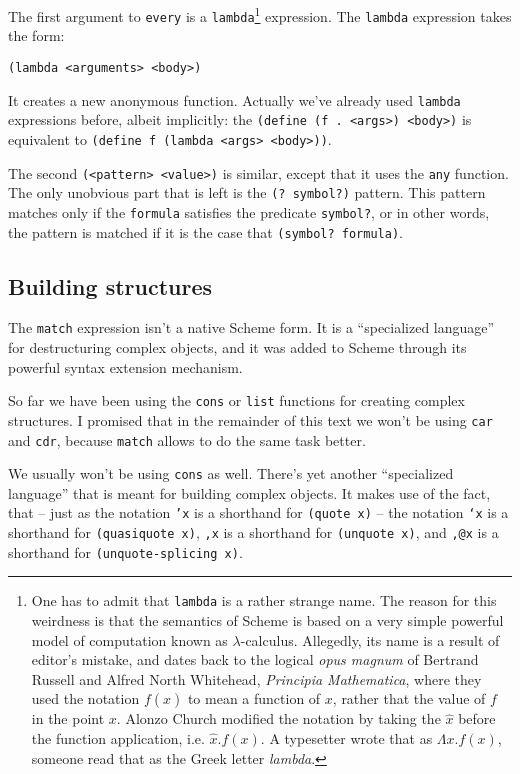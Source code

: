 The first argument to \texttt{every} is a \texttt{lambda}\footnote{
One has to admit that \texttt{lambda} is a rather strange name.
The reason for this weirdness is that the semantics of Scheme
is based on a very simple powerful model of computation known
as $\lambda$-calculus. Allegedly, its name is a result of editor's
mistake, and dates back to the logical \textit{opus magnum}
of Bertrand Russell and Alfred North Whitehead, \textit{Principia
Mathematica}, where they used the notation $f(\hat{x})$
to mean a function of $x$, rather that the value of $f$ in the
point $x$. Alonzo Church modified the notation by taking the
$\hat{x}$ before the function application, i.e. $\hat{x} . f(x)$.
A typesetter wrote that as $\Lambda x . f(x)$, someone read that
as the Greek letter \textit{lambda}\cite{Harrison1996}.} expression.
The \texttt{lambda} expression takes the form:

\texttt{(lambda <arguments> <body>)}

It creates a new anonymous function. Actually we've already used
\texttt{lambda} expressions before, albeit implicitly: the
\texttt{(define (f . <args>) <body>)} is equivalent to
\texttt{(define f (lambda <args> <body>))}.

The second \texttt{(<pattern> <value>)} is similar, except that
it uses the \texttt{any} function. The only unobvious part that is
left is the \texttt{(? symbol?)} pattern. This pattern matches
only if the \texttt{formula} satisfies the predicate \texttt{symbol?},
or in other words, the pattern is matched if it is the case that
\texttt{(symbol? formula)}.

\subsection{Building structures}

The \texttt{match} expression isn't a native Scheme form. It is
a ``specialized language'' for destructuring complex objects, and
it was added to Scheme through its powerful syntax extension
mechanism.

So far we have been using the \texttt{cons} or \texttt{list}
functions for creating complex structures. I promised that in
the remainder of this text we won't be using \texttt{car}
and \texttt{cdr}, because \texttt{match} allows to do the same
task better.

We usually won't be using \texttt{cons} as well. There's yet another
``specialized language'' that is meant for building complex objects.
It makes use of the fact, that -- just as the notation \texttt{'x}
is a shorthand for \texttt{(quote x)} -- the notation
\texttt{`x} is a shorthand for \texttt{(quasiquote x)}, 
\texttt{,x} is a shorthand for \texttt{(unquote x)}, and
\texttt{,@x} is a shorthand  for \texttt{(unquote-splicing x)}.

